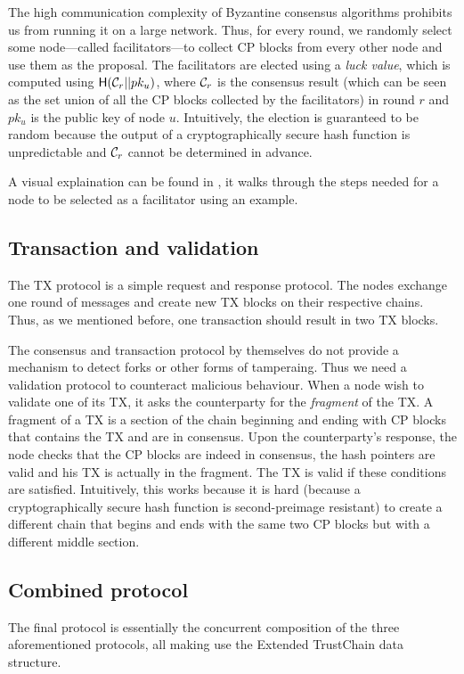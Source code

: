 The high communication complexity of Byzantine consensus algorithms prohibits us from running it on a large network.
Thus, for every round, we randomly select some node---called facilitators---to collect CP blocks from every other node and use them as the proposal.
The facilitators are elected using a \emph{luck value}, which is computed using $\textsf{H}(\mathcal{C}_r || pk_u)$,
where $\mathcal{C}_r$ is the consensus result 
(which can be seen as the set union of all the CP blocks collected by the facilitators)
in round $r$ and $pk_u$ is the public key of node $u$.
Intuitively, the election is guaranteed to be random 
because the output of a cryptographically secure hash function is unpredictable and $\mathcal{C}_r$ cannot be determined in advance.

A visual explaination can be found in ,
it walks through the steps needed for a node to be selected as a facilitator using an example.

\subsection{Transaction and validation}
The TX protocol is a simple request and response protocol.
The nodes exchange one round of messages and create new TX blocks on their respective chains.
Thus, as we mentioned before, one transaction should result in two TX blocks.

The consensus and transaction protocol by themselves do not provide a mechanism to detect forks or other forms of tamperaing.
Thus we need a validation protocol to counteract malicious behaviour.
When a node wish to validate one of its TX, it asks the counterparty for the \emph{fragment} of the TX.
A fragment of a TX is a section of the chain beginning and ending with CP blocks that contains the TX and are in consensus.
Upon the counterparty's response, the node checks that the CP blocks are indeed in consensus,
the hash pointers are valid and his TX is actually in the fragment.
The TX is valid if these conditions are satisfied.
Intuitively, this works because it is hard (because a cryptographically secure hash function is second-preimage resistant)
to create a different chain that begins and ends with the same two CP blocks but with a different middle section.


\subsection{Combined protocol}
\label{sec:combined-protocol}
The final protocol is essentially the concurrent composition of the three aforementioned protocols,
all making use the Extended TrustChain data structure.


